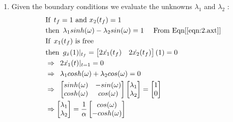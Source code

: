 \begin{enumerate}
  \begin{enumerate}
   \item Given the boundary conditions we evaluate the unknowns $\lambda_1$ and $\lambda_2$ :
   \begin{align*}
    &\text{If} \enskip t_f = 1 \text{ and } x_2(t_f) = 1 \\
    &\text{then} \enskip \lambda_1 sinh(\omega) - \lambda_2 sin(\omega) = 1 \quad \text{ From Eqn[\ref{eqn:2.axt}]}\\
    &\text{If} \enskip x_1(t_f) \text{ is free } \\
    &\text{then} \enskip g_{\dot x} (1) |_{t_f} = \begin{bmatrix}
                                                   2 \dot{x_1}(t_f) & 2 \dot{x_2}(t_f)\\
                                                  \end{bmatrix}(1)
 = 0 \\
    &\Rightarrow \enskip 2 \dot{x_1}(t) |_{t = 1} = 0\\
    &\Rightarrow \enskip \lambda_1 cosh(\omega) + \lambda_2 cos(\omega) = 0\\
    &\Rightarrow \enskip
			  \begin{bmatrix}
			    sinh(\omega) & -sin(\omega)\\
			    cosh(\omega) & cos(\omega) \\
			  \end{bmatrix} 
			  \begin{bmatrix}
                          \lambda_1 \\
			  \lambda_2 \\
                         \end{bmatrix} = 
			 \begin{bmatrix}
			  1 \\
			  0\\
			 \end{bmatrix}\\
    &\Rightarrow 	  \begin{bmatrix}
                          \lambda_1 \\
			  \lambda_2 \\
			 \end{bmatrix} = \frac{1}{\alpha} 
			 \begin{bmatrix}
			  cos(\omega)\\
			  -cosh(\omega)\\
			 \end{bmatrix}\\

\end{align*}
\end{enumerate}
\end{enumerate}
